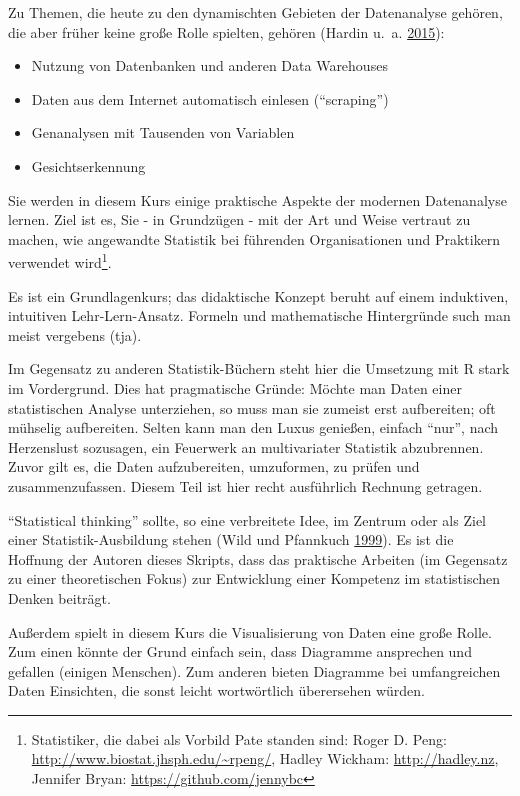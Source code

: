 \documentclass[12pt,ngerman,]{book}
\providecommand{\tightlist}{%
  \setlength{\itemsep}{0pt}\setlength{\parskip}{0pt}}
\let\rmarkdownfootnote\footnote%
\def\footnote{\protect\rmarkdownfootnote}
\theoremstyle{definition}
\theoremstyle{definition}
\theoremstyle{remark}
\begin{document}
Zu Themen, die heute zu den dynamischten Gebieten der Datenanalyse
gehören, die aber früher keine große Rolle spielten, gehören (Hardin
u.~a. \protect\hyperlink{ref-hardin2015data}{2015}):

\begin{itemize}
\tightlist
\item
  Nutzung von Datenbanken und anderen Data Warehouses
\item
  Daten aus dem Internet automatisch einlesen (``scraping'')
\item
  Genanalysen mit Tausenden von Variablen
\item
  Gesichtserkennung
\end{itemize}

Sie werden in diesem Kurs einige praktische Aspekte der modernen
Datenanalyse lernen. Ziel ist es, Sie - in Grundzügen - mit der Art und
Weise vertraut zu machen, wie angewandte Statistik bei führenden
Organisationen und Praktikern verwendet wird\footnote{Statistiker, die
  dabei als Vorbild Pate standen sind: Roger D. Peng:
  \url{http://www.biostat.jhsph.edu/~rpeng/}, Hadley Wickham:
  \url{http://hadley.nz}, Jennifer Bryan:
  \url{https://github.com/jennybc}}.

Es ist ein Grundlagenkurs; das didaktische Konzept beruht auf einem
induktiven, intuitiven Lehr-Lern-Ansatz. Formeln und mathematische
Hintergründe such man meist vergebens (tja).

Im Gegensatz zu anderen Statistik-Büchern steht hier die Umsetzung mit R
stark im Vordergrund. Dies hat pragmatische Gründe: Möchte man Daten
einer statistischen Analyse unterziehen, so muss man sie zumeist erst
aufbereiten; oft mühselig aufbereiten. Selten kann man den Luxus
genießen, einfach ``nur'', nach Herzenslust sozusagen, ein Feuerwerk an
multivariater Statistik abzubrennen. Zuvor gilt es, die Daten
aufzubereiten, umzuformen, zu prüfen und zusammenzufassen. Diesem Teil
ist hier recht ausführlich Rechnung getragen.

``Statistical thinking'' sollte, so eine verbreitete Idee, im Zentrum
oder als Ziel einer Statistik-Ausbildung stehen (Wild und Pfannkuch
\protect\hyperlink{ref-wild1999statistical}{1999}). Es ist die Hoffnung
der Autoren dieses Skripts, dass das praktische Arbeiten (im Gegensatz
zu einer theoretischen Fokus) zur Entwicklung einer Kompetenz im
statistischen Denken beiträgt.

Außerdem spielt in diesem Kurs die Visualisierung von Daten eine große
Rolle. Zum einen könnte der Grund einfach sein, dass Diagramme
ansprechen und gefallen (einigen Menschen). Zum anderen bieten Diagramme
bei umfangreichen Daten Einsichten, die sonst leicht wortwörtlich
überersehen würden.
\end{document}

